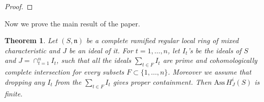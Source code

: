 \documentclass[10pt]{amsart}
\theoremstyle{plain}
\newtheorem{thm}{Theorem}[section]
\theoremstyle{definition}
\newcommand{\ideal}[1]{\mathfrak{#1}}
\newcommand{\n}{\ideal{n}}
\newcommand{\func}[1]{\mathrm{#1} \,}
\newcommand{\height}{\func{ht}}
\newcommand{\Ass}{\func{Ass}}
\begin{document}
\begin{proof}
\end{proof}

Now we prove the main result of the paper.

\begin{thm}
Let $(S,\n)$ be a %
complete ramified regular local ring of mixed characteristic and $J$ be an ideal of it. For $t=1,\ldots, n$, let $I_t$'s be the ideals  of $S$ and $J=\cap^n_{t=1} I_t$, such that all the ideals $\sum_{t\in F}I_t$ are prime and cohomologically complete intersection for every subsets $F\subset\{1,\dots,n\}$. Moreover we assume that dropping any $I_t$ from the $\sum_{t\in F}I_t$ gives proper containment. Then $\Ass H^i_{J} (S)$ is finite.
\end{thm}
\end{document}
